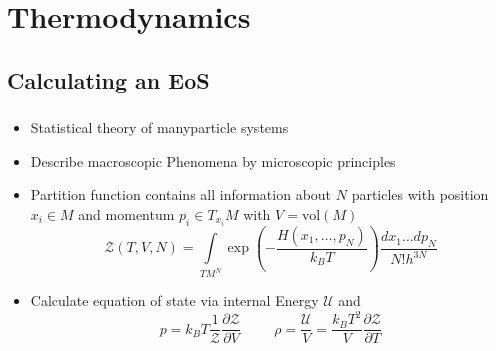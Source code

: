 \section{Thermodynamics}

\subsection{Calculating an EoS}
\begin{frame}
	\frametitle{\insertsubsection}
	\begin{itemize}[<+->]
		\item Statistical theory of manyparticle systems
		\item Describe macroscopic Phenomena by microscopic principles
		\item Partition function contains all information about $N$ particles with position $x_i\in M$ and momentum $p_i\in T_{x_i}M$ with $V=\text{vol}(M)$
		\begin{equation}
			\mathcal{Z}(T,V,N) = \int\limits_{TM^N}\exp\left(-\frac{H(x_1,\dots,p_N)}{k_BT}\right)\frac{dx_1\dots dp_N}{N!h^{3N}}
		\end{equation}
		\item Calculate equation of state via internal Energy $\mathcal{U}$ and
		\begin{equation}
			p = k_BT\frac{1}{\mathcal{Z}}\frac{\partial\mathcal{Z}}{\partial V} \hspace{1cm} \rho = \frac{\mathcal{U}}{V} = \frac{k_BT^2}{V}\frac{\partial\mathcal{Z}}{\partial T}
			\label{1-Thermo-Pres-Dens}
		\end{equation}
	\end{itemize}
\end{frame}

